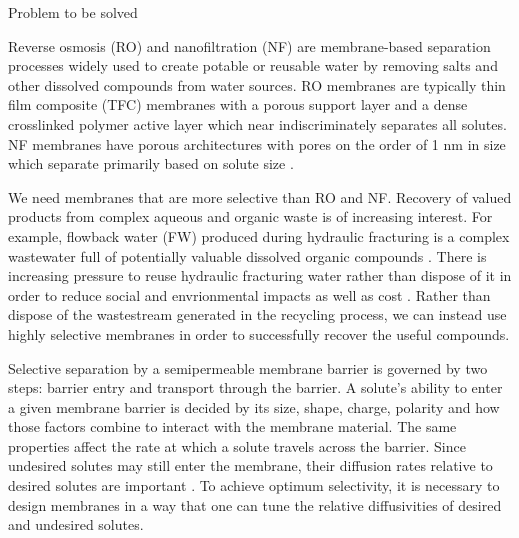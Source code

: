 \documentclass[journal=jpcbfk,manusciprt=article]{achemso}
\begin{document}
  Problem to be solved

  Reverse osmosis (RO) and nanofiltration (NF) are membrane-based separation
  processes widely used to create potable or reusable water by removing salts and
  other dissolved compounds from water sources. RO membranes are typically thin
  film composite (TFC) membranes with a porous support layer and a dense
  crosslinked polymer active layer which near indiscriminately 
  separates all solutes. 
NF membranes have porous architectures with pores on the order of 1 nm
  in size which separate primarily based on solute size
  \cite{van_der_bruggen_review_2003}. 

  We need membranes that are more selective than RO and NF. Recovery of valued
  products from complex aqueous and organic waste is of increasing interest. For
  example, flowback water (FW) produced during hydraulic fracturing is a complex
  wastewater full of potentially valuable dissolved organic compounds
  \cite{dischinger_application_2017}. There is increasing pressure to reuse
  hydraulic fracturing water rather than dispose of it in order to reduce social
  and envrionmental impacts as well as cost \cite{theodori_hydraulic_2014}.
  Rather than dispose of the wastestream generated in the recycling process, we
  can instead use highly selective membranes in order to successfully recover the
  useful compounds. 



  Selective separation by a semipermeable membrane barrier is governed by two
  steps: barrier entry and transport through the barrier. A solute's ability to
  enter a given membrane barrier is decided by its size, shape, charge, polarity
  and how those factors combine to interact with the membrane material. The same
  properties affect the rate at which a solute travels across the barrier. Since
  undesired solutes may still enter the membrane, their diffusion rates relative
  to desired solutes are important
  \cite{gin_polymerized_2008,wijmans_solution-diffusion_1995}. To achieve optimum
  selectivity, it is necessary to design membranes in a way that one can tune the
  relative diffusivities of desired and undesired solutes. 
\end{document}
